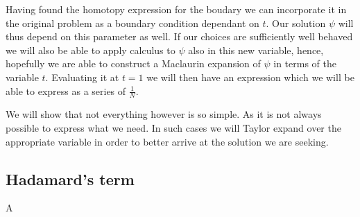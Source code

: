 \documentclass[../main.tex]{subfiles}
\begin{document}
		Having found the homotopy expression for the boudary we can incorporate it in the original problem as a boundary condition dependant on $ t $. Our solution $ \psi $ will thus depend on this parameter as well. If our choices are sufficiently well behaved we will also be able to apply calculus to $ \psi $ also in this new variable, hence, hopefully we are able to construct a Maclaurin expansion of $ \psi $ in terms of the variable $ t $. Evaluating it at $ t=1 $ we will then have an expression which we will be able to express as a series of $ \frac{1}{N} $.
		
		We will show that not everything however is so simple. As it is not always possible to express what we need. In such cases we will Taylor expand over the appropriate variable in order to better arrive at the solution we are seeking.
		
	\subsection{Hadamard's term}
		A
\end{document}
